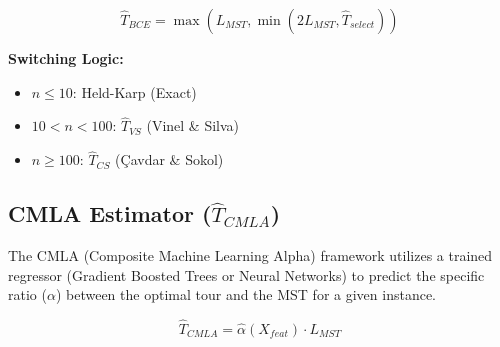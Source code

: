 \documentclass{article}
\begin{document}
\begin{equation}
    \hat{T}_{BCE} = \max(L_{MST}, \min(2 L_{MST}, \hat{T}_{select}))
\end{equation}

\noindent \textbf{Switching Logic:}
\begin{itemize}
    \item $n \le 10$: Held-Karp (Exact) \cite{held1962}
    \item $10 < n < 100$: $\hat{T}_{VS}$ (Vinel \& Silva)
    \item $n \ge 100$: $\hat{T}_{CS}$ (Çavdar \& Sokol)
\end{itemize}

\subsection{CMLA Estimator ($\hat{T}_{CMLA}$)}
The CMLA (Composite Machine Learning Alpha) framework utilizes a trained regressor (Gradient Boosted Trees or Neural Networks) to predict the specific ratio ($\alpha$) between the optimal tour and the MST for a given instance.

\begin{equation}
    \hat{T}_{CMLA} = \hat{\alpha}(X_{feat}) \cdot L_{MST}
\end{equation}
\end{document}
